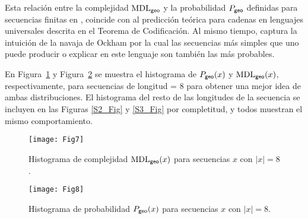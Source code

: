 
Esta relación entre la complejidad ${\rm MDL}_{{\sf geo}}$ y la probabilidad $P_{{\sf geo}}$ definidas para secuencias finitas en \gramgeo, coincide con al predicción teórica para cadenas en lenguajes universales descrita en el Teorema de Codificación. Al mismo tiempo, captura la intuición de la navaja de Ockham por la cual las secuencias más simples que uno puede producir o explicar en este lenguaje son también las más probables.


En Figura~\ref{fig:codK:8} y Figura~\ref{fig:codP:8} se muestra el histograma de $P_{{\sf geo}}(x)$ y ${\rm MDL}_{{\sf geo}}(x)$, respectivamente, para secuencias de longitud = 8 para obtener una mejor idea de ambas distribuciones. El histograma del resto de las longitudes de la secuencia se incluyen en las Figuras \ref{S2_Fig} y \ref{S3_Fig} por completitud, y todos muestran el mismo comportamiento.

\begin{figure}[!ht]
    \centering
    \texttt{[image: Fig7]}
    \caption{Histograma de complejidad ${\rm MDL}_{{\sf geo}}(x)$ para secuencias $x$ con $|x| = 8$.}
    \label{fig:codK:8}
\end{figure}


\begin{figure}[!ht]
    \centering
    \texttt{[image: Fig8]}
    \caption{Histograma de probabilidad $P_{{\sf geo}}(x)$ para secuencias $x$ con $|x| = 8$.}
    \label{fig:codP:8}
\end{figure}

